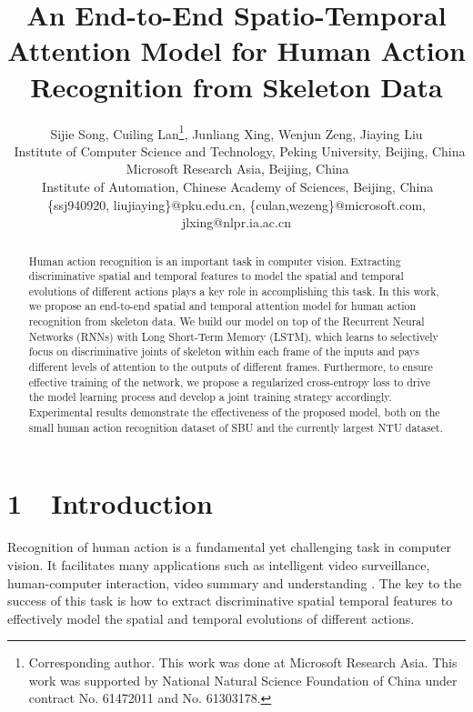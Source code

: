 \documentclass[letterpaper]{article}
\begin{document}
\title{An End-to-End Spatio-Temporal Attention Model for  Human Action Recognition from Skeleton Data}

\author{
	{Sijie Song{\small }, Cuiling Lan{\small }\thanks{Corresponding author. This work was done at Microsoft Research Asia. This work was supported by National Natural Science Foundation of China under contract No. 61472011 and No. 61303178.}, Junliang Xing{\small }, Wenjun Zeng{\small }}, Jiaying Liu{\small \large} \\
	\	Institute of Computer Science and Technology, Peking University, Beijing, China \\
    \,Microsoft Research Asia, Beijing, China \\
	\,Institute of Automation, Chinese Academy of Sciences, Beijing, China \\	
	\{ssj940920, liujiaying\}@pku.edu.cn,
	\{culan,wezeng\}@microsoft.com,
	jlxing@nlpr.ia.ac.cn
}


\maketitle
\begin{abstract}
Human action recognition is an important task in computer vision. Extracting discriminative spatial and temporal features to model the spatial and temporal evolutions of different actions plays a key role in accomplishing this task. In this work, we propose an end-to-end spatial and temporal attention model for human action recognition from skeleton data. We build our model on top of the Recurrent Neural Networks (RNNs) with Long Short-Term Memory (LSTM), which learns to selectively focus on discriminative joints of skeleton within each frame of the inputs and pays different levels of attention to the outputs of different frames. Furthermore, to ensure effective training of the network, we propose a regularized cross-entropy loss to drive the model learning process and develop a joint training strategy accordingly. Experimental results demonstrate the effectiveness of the proposed model, both on the small human action recognition dataset of SBU and the currently largest NTU dataset.


\end{abstract}


\section{1~~Introduction}
\label{sec:introduction}
Recognition of human action is a fundamental yet challenging task in computer vision. It facilitates many applications such as intelligent video surveillance, human-computer interaction, video summary and understanding \cite{IVC10SurveyAction,CVIU11SurveyAction}. The key to the success of this task is how to extract discriminative spatial temporal features to effectively model the spatial and temporal evolutions of different actions.
\end{document}
